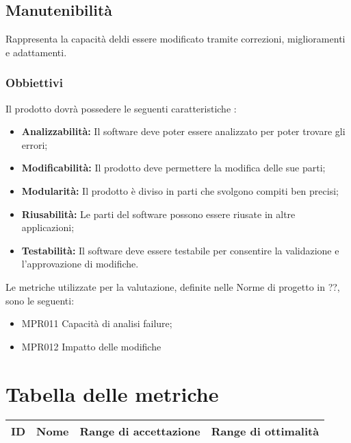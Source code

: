 \subsection{Manutenibilità}
Rappresenta la capacità deldi essere modificato tramite correzioni, miglioramenti e adattamenti.
\subsubsection{Obbiettivi } Il prodotto dovrà possedere le seguenti caratteristiche :
\begin{itemize}
	\item \textbf{Analizzabilità:} Il software deve poter essere analizzato per poter trovare gli errori;
	\item \textbf{Modificabilità:} Il prodotto deve permettere la modifica delle sue parti;
	\item \textbf{Modularità:} Il prodotto è diviso in parti che svolgono compiti ben precisi;
	\item \textbf{Riusabilità:} Le parti del software possono essere riusate in altre applicazioni;
	\item \textbf{Testabilità:} Il software deve essere testabile per consentire la validazione e l'approvazione di modifiche.
\end{itemize}	Le metriche utilizzate per la valutazione, definite nelle Norme di progetto in ??, sono le seguenti:
\begin{itemize}
	\item MPR011 Capacità di analisi failure;
	\item MPR012 Impatto delle modifiche
\end{itemize}

\section{Tabella delle metriche}
\begin{center}
	\begin{tabularx}{\textwidth}{|c|c|c|c|}
		\hline 
		\textbf{ID} & \textbf{Nome} & \textbf{Range di accettazione}  & \textbf{Range di ottimalità}  \\ 
		\hline
	\end{tabularx}
\end{center}